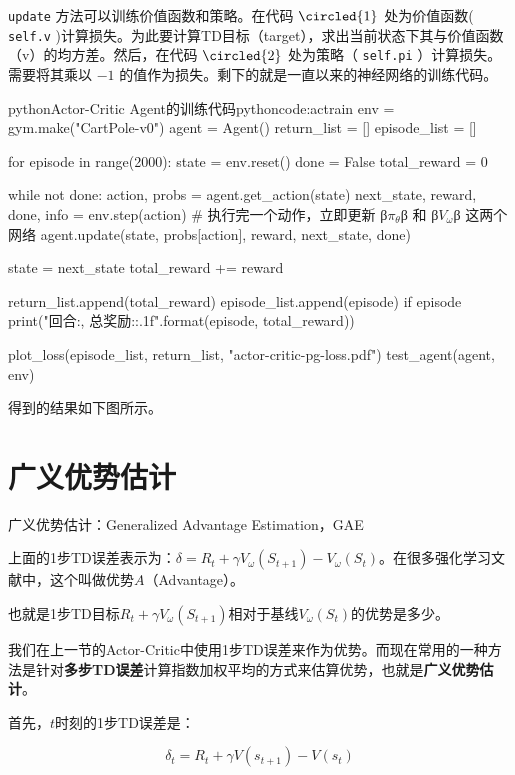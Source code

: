 \documentclass[lang=cn,newtx,10pt,scheme=chinese]{elegantbook}
\newcommand{\py}[1]{%
  \colorbox{gray!10}{\texttt{#1}}%
}
\begin{document}
\py{update}方法可以训练价值函数和策略。在代码 $\circled{1}$ 处为价值函数(\py{self.v})计算损失。为此要计算TD目标（target），求出当前状态下其与价值函数（v）的均方差。然后，在代码 $\circled{2}$ 处为策略（\py{self.pi}）计算损失。需要将其乘以 $-1$ 的值作为损失。剩下的就是一直以来的神经网络的训练代码。

\begin{codebox}{python}{Actor-Critic Agent的训练代码}{pythoncode:actrain}
env = gym.make("CartPole-v0")
agent = Agent()
return_list = []
episode_list = []

for episode in range(2000):
    state = env.reset()
    done = False
    total_reward = 0

    while not done:
        action, probs = agent.get_action(state)
        next_state, reward, done, info = env.step(action)
        # 执行完一个动作，立即更新 β$\pi_\theta$β 和 β$V_\omega$β 这两个网络
        agent.update(state, probs[action], reward, next_state, done)

        state = next_state
        total_reward += reward

    return_list.append(total_reward)
    episode_list.append(episode)
    if episode %
        print("回合:{}, 总奖励:{:.1f}".format(episode, total_reward))

plot_loss(episode_list, return_list, "actor-critic-pg-loss.pdf")
test_agent(agent, env)
\end{codebox}

得到的结果如下图所示。

\section{广义优势估计}

\begin{marker}
广义优势估计：Generalized Advantage Estimation，GAE
\end{marker}

上面的1步TD误差表示为：$\delta = R_{t} + \gamma V_{\omega}(S_{t+1}) - V_{\omega}(S_{t})$。在很多强化学习文献中，这个叫做优势$A$（Advantage）。

也就是1步TD目标$R_{t} + \gamma V_{\omega}(S_{t+1})$相对于基线$V_{\omega}(S_{t})$的优势是多少。

我们在上一节的Actor-Critic中使用1步TD误差来作为优势。而现在常用的一种方法是针对\textbf{多步TD误差}计算指数加权平均的方式来估算优势，也就是\textbf{广义优势估计}。

首先，$t$时刻的1步TD误差是：

\begin{equation}
\delta_t=R_t+\gamma V(s_{t+1})-V(s_t)
\end{equation}
\end{document}
